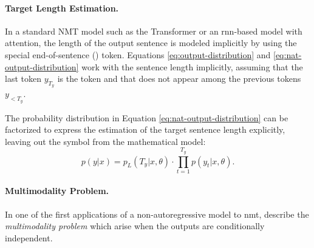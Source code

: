 \paragraph{Target Length Estimation.} In a standard NMT model such as the
Transformer or an \acs{rnn}-based model with attention, the length of the
output sentence is modeled implicitly by using the special end-of-sentence
(\eos{}) token. Equations \ref{eq:output-distribution} and
\ref{eq:nat-output-distribution} work with the sentence length implicitly,
assuming that the last token $y_{T_y}$ is the \eos{} token and that \eos{} does
not appear among the previous tokens $y_{<T_y}$.

The probability distribution in Equation \ref{eq:nat-output-distribution} can
be factorized to express the estimation of the target sentence length
explicitly, leaving out the \eos{} symbol from the mathematical model:
\begin{equation}
  p(y|x) = p_L(T_y|x, \theta) \cdot \prod_{t=1}^{T_y}p(y_t|x,\theta).
  \label{eq:explicit-length}
\end{equation}




\paragraph{Multimodality Problem.} In one of the first applications of a
non-autoregressive model to \ac{nmt}, \citet{gu2017nonautoregressive} describe
the \emph{multimodality problem} which arise when the outputs are conditionally
independent.


